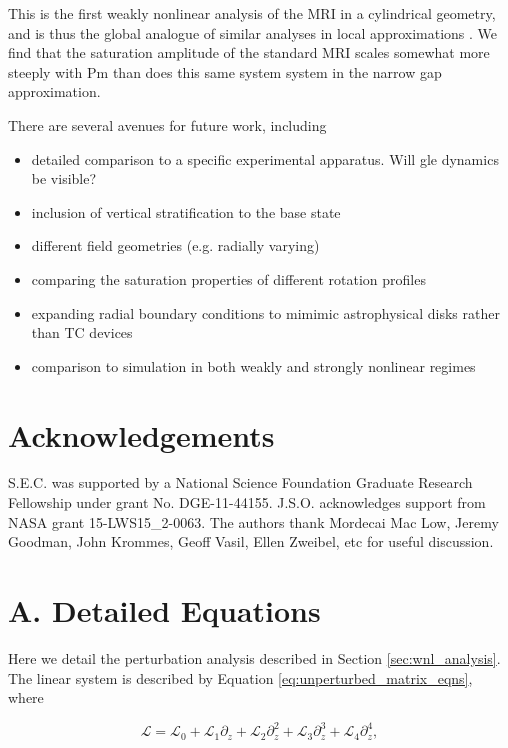 \documentclass{emulateapj}
\newcommand{\beq}{\begin{equation}}
\newcommand{\eeq}{\end{equation}}
\newcommand{\Pm}{\mathrm{Pm}}
\begin{document}
This is the first weakly nonlinear analysis of the MRI in a cylindrical geometry, and is thus the global analogue of similar analyses in local approximations \citep{Umurhan:2007hs,Vasil:2015}. We find that the saturation amplitude of the standard MRI scales somewhat more steeply with $\Pm$ than does this same system system in the narrow gap approximation.

There are several avenues for future work, including
\begin{itemize}
\item detailed comparison to a specific experimental apparatus. Will gle dynamics be visible? 
\item inclusion of vertical stratification to the base state
\item different field geometries (e.g. radially varying)
\item comparing the saturation properties of different rotation profiles
\item expanding radial boundary conditions to mimimic astrophysical disks rather than TC devices
\item comparison to simulation in both weakly and strongly nonlinear regimes
\end{itemize}

\section{Acknowledgements}
S.E.C. was supported by a National Science Foundation Graduate Research Fellowship under grant No. DGE-11-44155. J.S.O. acknowledges support from NASA grant 15-LWS15\_2-0063. The authors thank Mordecai Mac Low, Jeremy Goodman, John Krommes, Geoff Vasil, Ellen Zweibel, etc for useful discussion.



\clearpage
\appendix

\section{A. Detailed Equations}\label{app:basic_equations}

Here we detail the perturbation analysis described in Section \ref{sec:wnl_analysis}. The linear system is described by Equation \ref{eq:unperturbed_matrix_eqns}, where 

\beq
\mathcal{L} = \mathcal{L}_0 + \mathcal{L}_1 \partial_z + \mathcal{L}_2 \partial_z^2 + \mathcal{L}_3 \partial_z^3 + \mathcal{L}_4 \partial_z^4,
\eeq
\end{document}
